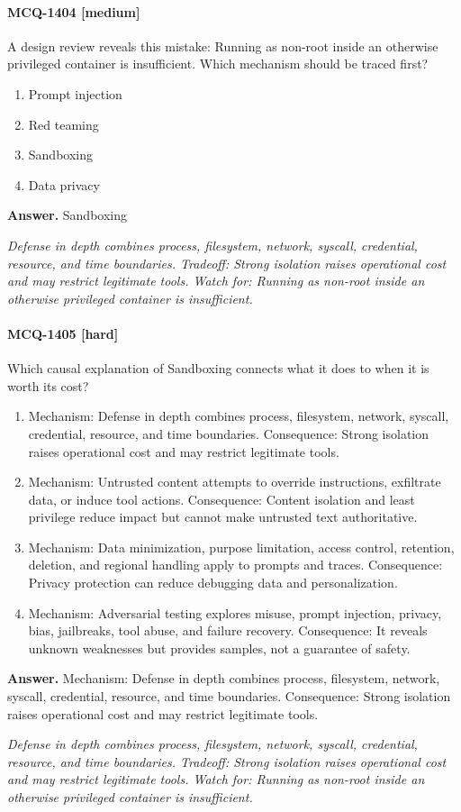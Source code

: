 \paragraph{MCQ-1404 [medium]} A design review reveals this mistake: Running as non-root inside an otherwise privileged container is insufficient. Which mechanism should be traced first?
\begin{enumerate}[label=\Alph*.]
\item Prompt injection
\item Red teaming
\item Sandboxing
\item Data privacy
\end{enumerate}
\noindent\textbf{Answer.} Sandboxing
\par\textit{Defense in depth combines process, filesystem, network, syscall, credential, resource, and time boundaries. Tradeoff: Strong isolation raises operational cost and may restrict legitimate tools. Watch for: Running as non-root inside an otherwise privileged container is insufficient.}
\paragraph{MCQ-1405 [hard]} Which causal explanation of Sandboxing connects what it does to when it is worth its cost?
\begin{enumerate}[label=\Alph*.]
\item Mechanism: Defense in depth combines process, filesystem, network, syscall, credential, resource, and time boundaries. Consequence: Strong isolation raises operational cost and may restrict legitimate tools.
\item Mechanism: Untrusted content attempts to override instructions, exfiltrate data, or induce tool actions. Consequence: Content isolation and least privilege reduce impact but cannot make untrusted text authoritative.
\item Mechanism: Data minimization, purpose limitation, access control, retention, deletion, and regional handling apply to prompts and traces. Consequence: Privacy protection can reduce debugging data and personalization.
\item Mechanism: Adversarial testing explores misuse, prompt injection, privacy, bias, jailbreaks, tool abuse, and failure recovery. Consequence: It reveals unknown weaknesses but provides samples, not a guarantee of safety.
\end{enumerate}
\noindent\textbf{Answer.} Mechanism: Defense in depth combines process, filesystem, network, syscall, credential, resource, and time boundaries. Consequence: Strong isolation raises operational cost and may restrict legitimate tools.
\par\textit{Defense in depth combines process, filesystem, network, syscall, credential, resource, and time boundaries. Tradeoff: Strong isolation raises operational cost and may restrict legitimate tools. Watch for: Running as non-root inside an otherwise privileged container is insufficient.}
